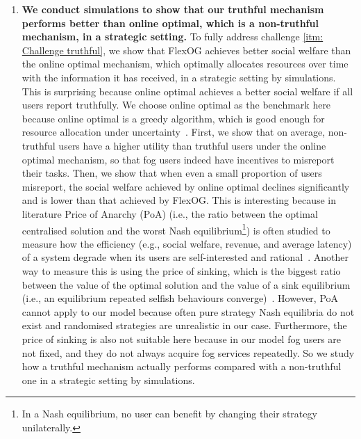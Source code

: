 \documentclass[11pt]{phdthesis}
\begin{document}
\begin{enumerate}
	\item \textbf{We conduct simulations to show that our truthful mechanism performs better than online optimal, which is a non-truthful mechanism, in a strategic setting.} To fully address challenge \ref{itm: Challenge truthful}, we show that FlexOG achieves better social welfare than the online optimal mechanism, which optimally allocates resources over time with the information it has received, in a strategic setting by simulations. This is surprising because online optimal achieves a better social welfare if all users report truthfully. We choose online optimal as the benchmark here because online optimal is a greedy algorithm, which is good enough for resource allocation under uncertainty~\citep{gupta2017stochastic}. First, we show that on average, non-truthful users have a higher utility than truthful users under the online optimal mechanism, so that fog users indeed have incentives to misreport their tasks. Then, we show that when even a small proportion of users misreport, the social welfare achieved by online optimal declines significantly and is lower than that achieved by FlexOG. This is interesting because in literature Price of Anarchy (PoA) (i.e., the ratio between the optimal centralised solution and the worst Nash equilibrium\footnote{In a Nash equilibrium, no user can benefit by changing their strategy unilaterally.}) is often studied to measure how the efficiency (e.g., social welfare, revenue, and average latency) of a system degrade when its users are self-interested and rational~\citep{koutsoupias1999worst}. Another way to measure this is using the price of sinking, which is the biggest ratio between the value of the optimal solution and the value of a sink equilibrium (i.e., an equilibrium repeated selfish behaviours converge)~\citep{goemans2005sink}. However, PoA cannot apply to our model because often pure strategy Nash equilibria do not exist and randomised strategies are unrealistic in our case. Furthermore, the price of sinking is also not suitable here because in our model fog users are not fixed, and they do not always acquire fog services repeatedly. So we study how a truthful mechanism actually performs compared with a non-truthful one in a strategic setting by simulations.
\end{enumerate}
\end{document}
